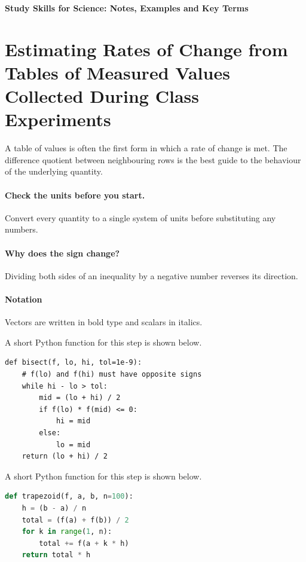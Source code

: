 \documentclass[11pt]{article}
\begin{document}
\begin{center}{\Large\bfseries Study Skills for Science: Notes, Examples and Key Terms}\end{center}

\section{Estimating Rates of Change from Tables of Measured Values Collected During Class Experiments}

A table of values is often the first form in which a rate of change is met. The difference quotient between neighbouring rows is the best guide to the behaviour of the underlying quantity.

\paragraph{Check the units before you start.} Convert every quantity to a single system of units before substituting any numbers.

\paragraph{Why does the sign change?} Dividing both sides of an inequality by a negative number reverses its direction.

\paragraph{Notation} Vectors are written in bold type and scalars in italics.

A short Python function for this step is shown below.

{\small\begin{verbatim}
def bisect(f, lo, hi, tol=1e-9):
    # f(lo) and f(hi) must have opposite signs
    while hi - lo > tol:
        mid = (lo + hi) / 2
        if f(lo) * f(mid) <= 0:
            hi = mid
        else:
            lo = mid
    return (lo + hi) / 2
\end{verbatim}}

A short Python function for this step is shown below.

\begin{lstlisting}[language=Python]
def trapezoid(f, a, b, n=100):
    h = (b - a) / n
    total = (f(a) + f(b)) / 2
    for k in range(1, n):
        total += f(a + k * h)
    return total * h
\end{lstlisting}
\end{document}
